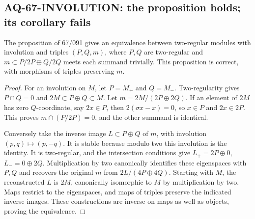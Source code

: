 \subsection{AQ-67-INVOLUTION: the proposition holds; its corollary fails}
The proposition of 67/091 gives an equivalence between
two-regular modules with involution and triples
$(P,Q,m)$, where $P,Q$ are two-regular and
$m\subset P/2P\oplus Q/2Q$ meets each summand trivially.
This proposition is correct, with morphisms of triples
preserving $m$.
\begin{proof}
For an involution on $M$, let $P=M_+$ and $Q=M_-$.
Two-regularity gives $P\cap Q=0$ and
$2M\subset P\oplus Q\subset M$.
Let $m=2M/(2P\oplus2Q)$. If an element of $2M$
has zero $Q$-coordinate, say $2x\in P$, then
$2(\sigma x-x)=0$, so $x\in P$ and $2x\in2P$.
This proves $m\cap(P/2P)=0$, and the other summand
is identical.

Conversely take the inverse image
$L\subset P\oplus Q$ of $m$, with involution
$(p,q)\mapsto(p,-q)$. It is stable because modulo
two this involution is the identity. It is
two-regular, and the intersection conditions give
$L_+=2P\oplus0$, $L_-=0\oplus2Q$.
Multiplication by two canonically identifies these
eigenspaces with $P,Q$ and recovers the original
$m$ from $2L/(4P\oplus4Q)$.
Starting with $M$, the reconstructed $L$ is $2M$,
canonically isomorphic to $M$ by multiplication
by two. Maps restrict to the eigenspaces, and
maps of triples preserve the indicated inverse
images. These constructions are inverse on maps
as well as objects, proving the equivalence.
\end{proof}

